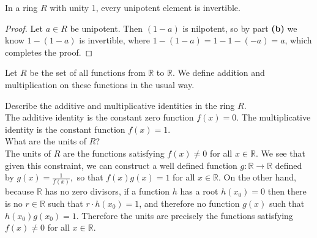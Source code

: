 \documentclass{article}
\newenvironment{problem2}[1]{\noindent {\bf (#1}}
{\medskip}
\newenvironment{problem1}[1]{\noindent {\bf Problem #1:}}
{\medskip}
\begin{document}
\begin{problem2}{f)} In a ring $R$ with unity 1, every unipotent element is invertible. 
\begin{proof} Let $a\in R$ be unipotent. Then $(1-a)$ is nilpotent, so by part \textbf{(b)} we know $1-(1-a)$ is invertible, where $1-(1-a)=1-1-(-a)=a$, which completes the proof.
\end{proof}
\end{problem2}



\begin{problem1}{3} Let $R$ be the set of all functions from $\mathbb{R}$ to $\mathbb{R}$. We define addition and multiplication on these functions in the usual way.\end{problem1}

\begin{problem2}{a)} Describe the additive and multiplicative identities in the ring $R$.\\

The additive identity is the constant zero function $f(x)=0$. The multiplicative identity is the constant function $f(x)=1$.\end{problem2}\\

\begin{problem2}{b)} What are the units of $R$?\\

The units of $R$ are the functions satisfying $f(x)\ne0$ for all $x\in\mathbb{R}$. We see that given this constraint, we can construct a well defined function $g:\mathbb{R}\to\mathbb{R}$ defined by $g(x)=\frac{1}{f(x)},$ so that $f(x)g(x)=1$ for all $x\in \mathbb{R}$. On the other hand, because $\mathbb{R}$ has no zero divisors, if a function $h$ has a root $h(x_0)=0$ then there is no $r\in\mathbb{R}$ such that $r\cdot h(x_0)=1$, and therefore no function $g(x)$ such that $h(x_0)g(x_0)=1$. Therefore the units are precisely the functions satisfying $f(x)\ne0$ for all $x\in\mathbb{R}$.
\end{problem2}\\
\end{document}
